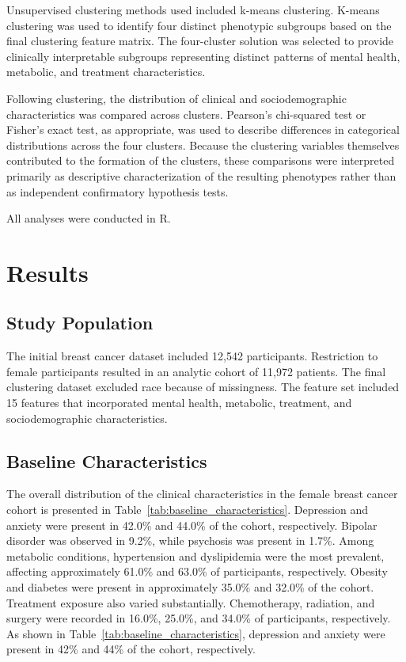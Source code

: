 \documentclass[11pt]{article}
\begin{document}
Unsupervised clustering methods used included k-means clustering. K-means clustering was used to identify four distinct phenotypic subgroups based on the final clustering feature matrix. The four-cluster solution was selected to provide clinically interpretable subgroups representing distinct patterns of mental health, metabolic, and treatment characteristics.

Following clustering, the distribution of clinical and sociodemographic characteristics was compared across clusters. Pearson's chi-squared test or Fisher's exact test, as appropriate, was used to describe differences in categorical distributions across the four clusters. Because the clustering variables themselves contributed to the formation of the clusters, these comparisons were interpreted primarily as descriptive characterization of the resulting phenotypes rather than as independent confirmatory hypothesis tests. 

All analyses were conducted in R. 


\section{Results}

\subsection{Study Population}

The initial breast cancer dataset included 12,542 participants. Restriction to female participants resulted in an analytic cohort of 11,972 patients.
The final clustering dataset excluded race because of missingness. The feature set included 15 features that incorporated mental health, metabolic, treatment, and sociodemographic characteristics.

\subsection{Baseline Characteristics}

The overall distribution of the clinical characteristics in the female breast cancer cohort is presented in Table~\ref{tab:baseline_characteristics}. Depression and anxiety were present in 42.0\% and 44.0\% of the cohort, respectively. Bipolar disorder was observed in 9.2\%, while psychosis was present in 1.7\%. Among metabolic conditions, hypertension and dyslipidemia were the most prevalent, affecting approximately 61.0\% and 63.0\% of participants, respectively. Obesity and diabetes were present in approximately 35.0\% and 32.0\% of the cohort. Treatment exposure also varied substantially. Chemotherapy, radiation, and surgery were recorded in 16.0\%, 25.0\%, and 34.0\% of participants, respectively. As shown in Table~\ref{tab:baseline_characteristics}, depression and anxiety were present in 42\% and 44\% of the cohort, respectively.
\end{document}
